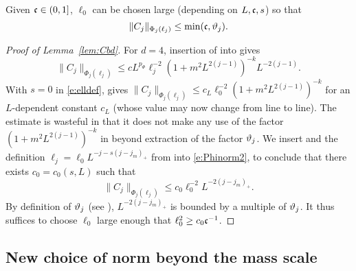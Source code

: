 \begin{lemma}
\label{lem:Cbd}
Given $\mathfrak{c} \in (0, 1]$, $\ell_0$ can be chosen large (depending on $L,\mathfrak{c},s$)
so that
\begin{equation}
\lbeq{Cbd}
\|C_j\|_{\Phi_{j}(\ell_j)} \leq \min(\ellconst, \chicCov_j).
\end{equation}
\end{lemma}

\begin{proof}[Proof of Lemma~\ref{lem:Cbd}]
For $d=4$, insertion of  into  gives
\begin{equation}
    \label{e:Phinorm2}
    \|C_j\|_{\Phi_{j}(\ell_j)}
    \le
    c
    L^{p_\Phi}
    \ell_j^{-2}(1+m^2L^{2(j-1)})^{-k}
    L^{-2(j-1)}.
\end{equation}
With $s=0$ in \eqref{e:elldef},  gives
$\|C_j\|_{\Phi_{j}(\ell_j)} \le c_L \ell_0^{-2} (1+m^2L^{2(j-1)})^{-k}$
for an $L$-dependent constant $c_L$ (whose value may now change from line to line).
The estimate \cite[\eqref{IE-e:CLbd}]{BS-rg-IE}
is wasteful in that it does not make any use of the factor
$(1+m^2L^{2(j-1)})^{-k}$ in  beyond extraction of the factor $\vartheta_j$.
We insert  and the definition $\ell_j=\ell_0 L^{-j-s(j-j_m)_+}$ from
 into
\eqref{e:Phinorm2}, to conclude that there exists $c_0 = c_0(s, L)$ such that
\begin{equation}
    \|C_j\|_{\Phi_{j}(\ell_j)} \leq c_0 \ell_0^{-2} L^{-2(j - j_m)_+}
    .
\end{equation}
By definition of $\vartheta_j$ (see \cite[Section~\ref{IE-sec:frp}]{BS-rg-IE}),
$L^{-2(j - j_m)_+}$ is bounded by a multiple of $\vartheta_j$.
It thus suffices to choose $\ell_0$ large enough that
$\ell_0^2 \ge c_0 \mathfrak{c}^{-1}$.
\end{proof}


\subsection{New choice of norm beyond the mass scale}
\label{sec:newnorm}



